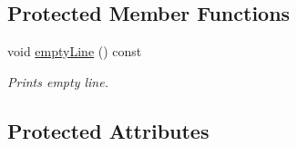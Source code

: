 \subsection*{Protected Member Functions}
\begin{DoxyCompactItemize}
\item 
\hypertarget{class_menu_a58897c5c59d341626fa536ea91960fd5}{}void \hyperlink{class_menu_a58897c5c59d341626fa536ea91960fd5}{empty\+Line} () const \label{class_menu_a58897c5c59d341626fa536ea91960fd5}

\begin{DoxyCompactList}\small\item\em Prints empty line. \end{DoxyCompactList}\end{DoxyCompactItemize}
\subsection*{Protected Attributes}
